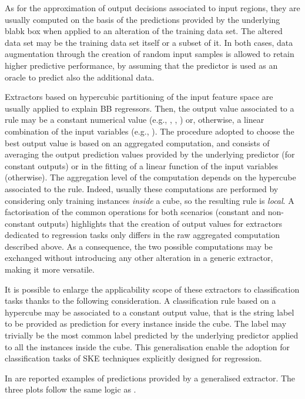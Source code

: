 \documentclass[
]{ceurart}
\begin{document}
As for the approximation of output decisions associated to input regions, they are usually computed on the basis of the predictions provided by the underlying blabk box when applied to an alteration of the training data set.
%
The altered data set may be the training data set itself or a subset of it.
%
In both cases, data augmentation through the creation of random input samples is allowed to retain higher predictive performance, by assuming that the predictor is used as an oracle to predict also the additional data.

Extractors based on hypercubic partitioning of the input feature space are usually applied to explain BB regressors.
%
Then, the output value associated to a rule may be a constant numerical value (e.g., \iter{}, \gridex{}, \cart{}) or, otherwise, a linear combination of the input variables (e.g., \cart{}).
%
The procedure adopted to choose the best output value is based on an aggregated computation, and consists of averaging the output prediction values provided by the underlying predictor (for constant outputs) or in the fitting of a linear function of the input variables (otherwise).
%
The aggregation level of the computation depends on the hypercube associated to the rule.
%
Indeed, usually these computations are performed by considering only training instances \emph{inside} a cube, so the resulting rule is \emph{local}.
%
A factorisation of the common operations for both scenarios (constant and non-constant outputs) highlights that the creation of output values for extractors dedicated to regression tasks only differs in the raw aggregated computation described above.
%
As a consequence, the two possible computations may be exchanged without introducing any other alteration in a generic extractor, making it more versatile.

It is possible to enlarge the applicability scope of these extractors to classification tasks thanks to the following consideration.
%
A classification rule based on a hypercube may be associated to a constant output value, that is the string label to be provided as prediction for every instance inside the cube.
%
The label may trivially be the most common label predicted by the underlying predictor applied to all the instances inside the cube.
%
This generalisation enable the adoption for classification tasks of SKE techniques explicitly designed for regression.



In  are reported examples of predictions provided by a generalised extractor.
%
The three plots follow the same logic as .
\end{document}
